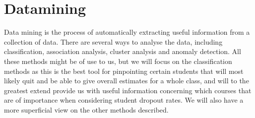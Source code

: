 \section{Datamining}
Data mining is the process of automatically extracting useful information from a collection of data. There are several ways to analyse the data, including classification, association analysis, cluster analysis and anomaly detection. All these methods might be of use to us, but we will focus on the classification methods as this is the best tool for pinpointing certain students that will most likely quit and be able to give overall estimates for a whole class, and will to the greatest extend provide us with useful information concerning which courses that are of importance when considering student dropout rates. We will also have a more superficial view on the other methods described.

